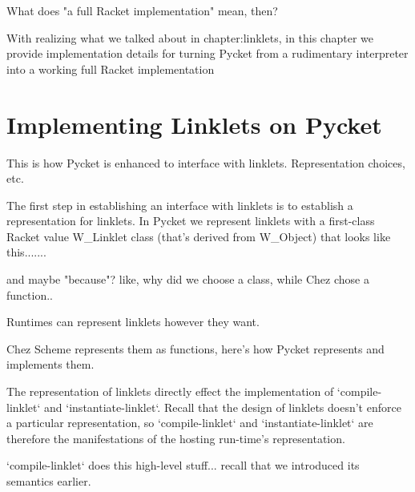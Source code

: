 	\begin{paragraph-here}%
		What does "a full Racket implementation" mean, then?
	\end{paragraph-here}

	\begin{paragraph-here}%
		With realizing what we talked about in chapter:linklets, in this chapter we provide implementation details for turning Pycket from a rudimentary interpreter into a working full Racket implementation
	\end{paragraph-here}

	\section[\texorpdfstring{Implementing Linklets on Pycket}{Linklets on Pycket}]{Implementing Linklets on Pycket}

		\begin{mainpoint}
			This is how Pycket is enhanced to interface with linklets. Representation choices, etc.
		\end{mainpoint}

		\begin{paragraph-here}%
			The first step in establishing an interface with linklets is to establish a representation for linklets. In Pycket we represent linklets with a first-class Racket value W\_Linklet class (that's derived from W\_Object) that looks like this.......

			and maybe "because"? like, why did we choose a class, while Chez chose a function..

			Runtimes can represent linklets however they want.

		Chez Scheme represents them as functions, here's how Pycket represents and implements them.
		\end{paragraph-here}

		\begin{paragraph-here}%
			The representation of linklets directly effect the implementation of `compile-linklet` and `instantiate-linklet`. Recall that the design of linklets doesn't enforce a particular representation, so `compile-linklet` and `instantiate-linklet` are therefore the manifestations of the hosting run-time's representation.
		\end{paragraph-here}

		\begin{paragraph-here}%
			`compile-linklet` does this high-level stuff... recall that we introduced its semantics earlier.
		\end{paragraph-here}

